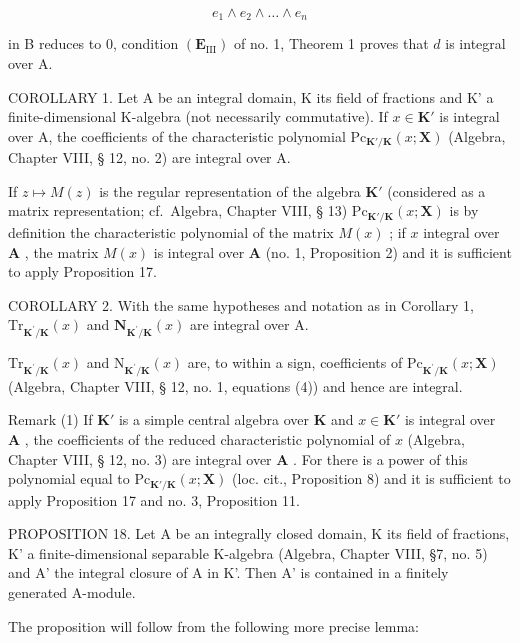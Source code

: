 \[
e _ {1} \wedge e _ {2} \wedge \dots \wedge e _ {n}
\]

in B reduces to 0, condition \((\mathbf{E}_{\mathrm{III}})\) of no. 1, Theorem 1 proves that \(d\) is integral over A.

COROLLARY 1. Let A be an integral domain, K its field of fractions and K' a finite-dimensional K-algebra (not necessarily commutative). If \(x \in \mathbf{K}'\) is integral over A, the coefficients of the characteristic polynomial \(\mathrm{Pc}_{\mathbf{K}' / \mathbf{K}}(x; \mathbf{X})\) (Algebra, Chapter VIII, § 12, no. 2) are integral over A.

If \(z \mapsto M(z)\) is the regular representation of the algebra \(\mathbf{K}'\) (considered as a matrix representation; cf.~Algebra, Chapter VIII, § 13) \(\mathrm{Pc}_{\mathbf{K}' / \mathbf{K}}(x; \mathbf{X})\) is by definition the characteristic polynomial of the matrix \(M(x)\) ; if \(x\) integral over \(\mathbf{A}\) , the matrix \(M(x)\) is integral over \(\mathbf{A}\) (no. 1, Proposition 2) and it is sufficient to apply Proposition 17.

COROLLARY 2. With the same hypotheses and notation as in Corollary 1, \(\mathrm{Tr}_{\mathbf{K}^{\prime}/\mathbf{K}}(x)\) and \(\mathbf{N}_{\mathbf{K}^{\prime}/\mathbf{K}}(x)\) are integral over A.

\(\mathrm{Tr}_{\mathbf{K}^{\prime}/\mathbf{K}}(x)\) and \(\mathrm{N}_{\mathbf{K}^{\prime}/\mathbf{K}}(x)\) are, to within a sign, coefficients of \(\mathrm{Pc}_{\mathbf{K}^{\prime}/\mathbf{K}}(x;\mathbf{X})\) (Algebra, Chapter VIII, § 12, no. 1, equations (4)) and hence are integral.

Remark (1) If \(\mathbf{K}'\) is a simple central algebra over \(\mathbf{K}\) and \(x \in \mathbf{K}'\) is integral over \(\mathbf{A}\) , the coefficients of the reduced characteristic polynomial of \(x\) (Algebra, Chapter VIII, § 12, no. 3) are integral over \(\mathbf{A}\) . For there is a power of this polynomial equal to \(\mathrm{Pc}_{\mathbf{K}' / \mathbf{K}}(x; \mathbf{X})\) (loc. cit., Proposition 8) and it is sufficient to apply Proposition 17 and no. 3, Proposition 11.

PROPOSITION 18. Let A be an integrally closed domain, K its field of fractions, K' a finite-dimensional separable K-algebra (Algebra, Chapter VIII, §7, no. 5) and A' the integral closure of A in K'. Then A' is contained in a finitely generated A-module.

The proposition will follow from the following more precise lemma:

